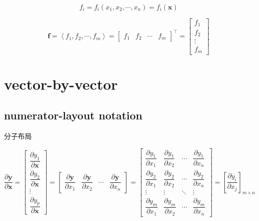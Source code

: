 \documentclass[
]{book}
\theoremstyle{definition}
\theoremstyle{definition}
\theoremstyle{definition}
\theoremstyle{definition}
\theoremstyle{remark}
\begin{document}
\[
f_i = f_i\left(x_{1},x_{2},\cdots,x_{n}\right)=f_i\left(\boldsymbol{x}\right)
\]

\[
\boldsymbol{f}=\left\langle f_{1},f_{2},\cdots,f_{m}\right\rangle =\begin{bmatrix}f_{1} & f_{2} & \cdots & f_{m}\end{bmatrix}^{\intercal}=\begin{bmatrix}f_{1}\\
f_{2}\\
\vdots\\
f_{m}
\end{bmatrix}
\]

\section{vector-by-vector}\label{vector-by-vector}

\subsection{numerator-layout notation}\label{numerator-layout-notation}

\begin{CJK}{UTF8}{bsmi}
分子布局
\end{CJK}

\[
\dfrac{\partial\boldsymbol{y}}{\partial\boldsymbol{x}}=\begin{bmatrix}\dfrac{\partial y_{1}}{\partial\boldsymbol{x}}\\
\dfrac{\partial y_{2}}{\partial\boldsymbol{x}}\\
\vdots\\
\dfrac{\partial y_{p}}{\partial\boldsymbol{x}}
\end{bmatrix}=\begin{bmatrix}\dfrac{\partial\boldsymbol{y}}{\partial x_{1}} & \dfrac{\partial\boldsymbol{y}}{\partial x_{2}} & \cdots & \dfrac{\partial\boldsymbol{y}}{\partial x_{n}}\end{bmatrix}=\begin{bmatrix}\dfrac{\partial y_{1}}{\partial x_{1}} & \dfrac{\partial y_{1}}{\partial x_{2}} & \cdots & \dfrac{\partial y_{1}}{\partial x_{n}}\\
\dfrac{\partial y_{2}}{\partial x_{1}} & \dfrac{\partial y_{2}}{\partial x_{2}} & \cdots & \dfrac{\partial y_{2}}{\partial x_{n}}\\
\vdots & \vdots & \ddots & \vdots\\
\dfrac{\partial y_{m}}{\partial x_{1}} & \dfrac{\partial y_{m}}{\partial x_{2}} & \cdots & \dfrac{\partial y_{m}}{\partial x_{n}}
\end{bmatrix}=\left[\dfrac{\partial y_{i}}{\partial x_{j}}\right]_{m\times n}
\]
\end{document}
